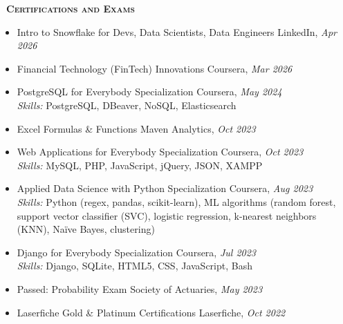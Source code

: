 \documentclass[a4paper,11pt]{article}
\newcommand{\header} [1] {
    {\textsc{\textbf{\Large{\xrfill[0.5ex]{0.5pt}~#1~\xrfill[0.5ex]{0.5pt}}}}}
}
\begin{document}
\vspace{1mm}
\header{Certifications and Exams} 
\vspace{1mm}

\begin{itemize}
\item Intro to Snowflake for Devs, Data Scientists, Data Engineers \hfill LinkedIn, \textit{Apr 2026}
\item Financial Technology (FinTech) Innovations \hfill Coursera, \textit{Mar 2026}
\item PostgreSQL for Everybody Specialization \hfill Coursera, \textit{May 2024}\\
\textit{Skills:} PostgreSQL, DBeaver, NoSQL, Elasticsearch
\item Excel Formulas \& Functions \hfill Maven Analytics, \textit{Oct 2023}
\item Web Applications for Everybody Specialization \hfill Coursera, \textit{Oct 2023}\\
\textit{Skills:} MySQL, PHP, JavaScript, jQuery, JSON, XAMPP
\item Applied Data Science with Python Specialization \hfill Coursera, \textit{Aug 2023}\\
\textit{Skills:} Python (regex, pandas, scikit-learn), ML algorithms (random forest, support vector classifier (SVC), logistic regression, k-nearest neighbors (KNN), Na\"{i}ve Bayes, clustering)
\item Django for Everybody Specialization \hfill Coursera, \textit{Jul 2023}\\
\textit{Skills:} Django, SQLite, HTML5, CSS, JavaScript, Bash
\item Passed: Probability Exam \hfill Society of Actuaries, \textit{May 2023}
\item Laserfiche Gold \& Platinum Certifications \hfill Laserfiche, \textit{Oct 2022}
\end{itemize}
\end{document}
